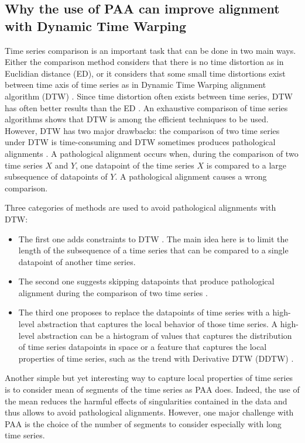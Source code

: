 \subsection{Why the use of PAA can improve alignment with Dynamic Time Warping}

 Time series comparison is an important task that
can be done in two main ways.
Either the comparison method  considers that there is no time distortion as in Euclidian distance
(ED), or it considers that  some small time distortions  exist between time axis of time series as
in Dynamic Time Warping alignment algorithm (DTW)
\cite{Zhang_Tang_Duan_2015}. Since time distortion often exists between time series, DTW  has often
better results than the ED \cite{UCRArchive}. An exhaustive comparison of time series algorithms
\cite{Bagnall} shows that DTW is among the efficient techniques to be used. However, DTW has two major
drawbacks:
 the comparison of two time series under DTW is time-consuming
\cite{Rakthanmanon_Campana_Mueen_Batista_Westover_Zhu_Zakaria_Keogh_2012} and  DTW
sometimes produces pathological alignments \cite{Keogh_Pazzani_2001}. A
pathological alignment occurs when, during the comparison of two time  series $X$
and $Y$, one datapoint of the time series $X$ is compared to a large subsequence
of datapoints of $Y$.  A pathological alignment causes a wrong comparison.


 Three categories of methods are used to avoid pathological alignments with DTW:

\begin{itemize}
  \item The first one adds constraints to DTW \cite{Ratanamahatana_Keogh_2004, Yu_Yu_Hu_Liu_Wu_2011, candan2012sdtw, sakoe1978dynamic, jeong2011weighted, salvador2007toward}.
  The main idea here is to limit the length of the subsequence of a time series
  that can be compared to a single datapoint of another time series.
  
  \item The second one suggests skipping datapoints that
  produce pathological alignment during the comparison of two time series \cite{longin2005elastic, itakura1975minimum, myers1980performance}.
  \item The third one proposes to replace the datapoints of time
  series with a high-level abstraction that captures the local behavior of those
  time series. A high-level abstraction can be a histogram of values that
  captures the distribution of time series datapoints in space \cite{Zhang_Tang_Duan_2015} or a 
  feature that captures the local  properties of time series, such as the trend with Derivative DTW
  (DDTW) \cite{Keogh_Pazzani_2001}.
\end{itemize}
Another simple but yet interesting way to capture local properties of time series is to consider
mean of segments of the time series as PAA does. Indeed, the use of the mean reduces the harmful
effects of singularities contained in the data and thus allows to avoid pathological
alignments.  However, one major challenge with PAA is the choice of the number of segments to
consider especially with long time series.


